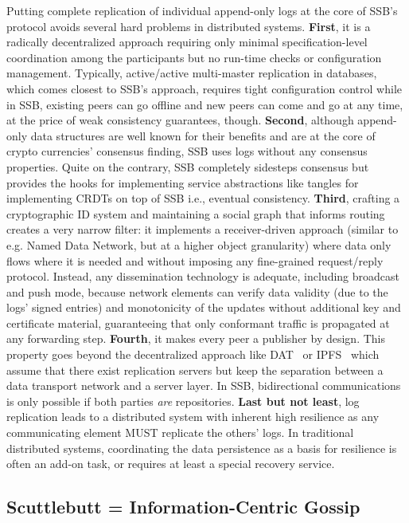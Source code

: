 \documentclass[sigconf]{acmart}
\begin{document}
Putting complete replication of individual append-only logs at the
core of SSB's protocol avoids several hard problems in distributed
systems. {\bf First}, it is a radically decentralized approach
requiring only minimal specification-level coordination among the
participants but no run-time checks or configuration
management. Typically, active/active multi-master replication in
databases, which comes closest to SSB's approach, requires tight
configuration control while in SSB, existing peers can go offline and
new peers can come and go at any time, at the price of weak
consistency guarantees, though. {\bf Second}, although append-only
data structures are well known for their benefits and are at the core
of crypto currencies' consensus finding, SSB uses logs without any
consensus properties. Quite on the contrary, SSB completely sidesteps
consensus but provides the hooks for implementing service abstractions
like tangles for implementing CRDTs on top of SSB i.e., eventual
consistency. {\bf Third}, crafting a cryptographic ID system and
maintaining a social graph that informs routing creates a very narrow
filter: it implements a receiver-driven approach (similar to
e.g. Named Data Network, but at a higher object granularity) where
data only flows where it is needed and without imposing any
fine-grained request/reply protocol. Instead, any dissemination
technology is adequate, including broadcast and push mode, because
network elements can verify data validity (due to the logs' signed
entries) and monotonicity of the updates without additional key and
certificate material, guaranteeing that only conformant traffic is
propagated at any forwarding step. {\bf Fourth}, it makes every peer a
publisher by design. This property goes beyond the decentralized
approach like DAT~\cite{} or IPFS~\cite{} which assume that there
exist replication servers but keep the separation between a data
transport network and a server layer. In SSB, bidirectional
communications is only possible if both parties {\em are}
repositories. {\bf Last but not least}, log replication leads to a
distributed system with inherent high resilience as any communicating
element MUST replicate the others' logs. In traditional distributed
systems, coordinating the data persistence as a basis for resilience
is often an add-on task, or requires at least a special recovery
service.


\subsection*{Scuttlebutt = Information-Centric Gossip}
\end{document}
